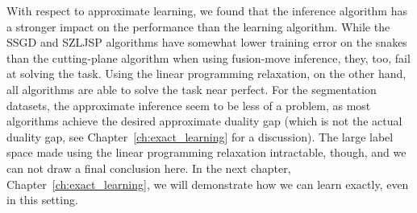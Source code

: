 With respect to approximate learning, we found that the inference algorithm has
a stronger impact on the performance than the learning algorithm.
While the SSGD and SZLJSP algorithms have somewhat lower training error on the snakes than
the cutting-plane algorithm when using fusion-move inference, they, too, fail at solving the task.
Using the linear programming relaxation, on the other hand, all algorithms are able to solve the
task near perfect.
For the segmentation datasets, the approximate inference seem to be less of a
problem, as most algorithms achieve the desired approximate duality gap (which
is not the actual duality gap, see Chapter~\ref{ch:exact_learning} for a
discussion).
The large label space made using the linear programming relaxation intractable,
though, and we can not draw a final conclusion here. In the next chapter,
Chapter~\ref{ch:exact_learning}, we will demonstrate how we can learn exactly,
even in this setting.
